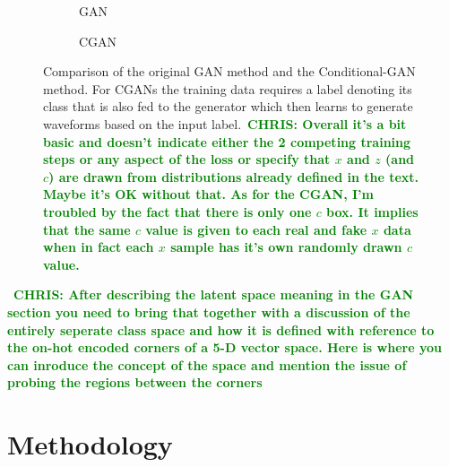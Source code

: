\documentclass[12pt]{iopart}
\newcommand{\chris}[1]{\textbf{\textcolor{green}{CHRIS: #1}}}
\begin{document}
\begin{figure}[h!]
    \begin{subfigure}{.5\textwidth}
     \centering
        
        \caption{GAN}
    \end{subfigure}
    \begin{subfigure}{.5\textwidth}
     \centering
        
        \caption{CGAN}
    \end{subfigure}
    \caption{Comparison of the original GAN method and the
Conditional-GAN method. For CGANs the training data requires a label denoting
its class that is also fed to the generator which then learns to generate
waveforms based on the input label.~\chris{Overall it's a bit basic and doesn't indicate either the
2 competing training steps or any aspect of the loss or specify that $x$ and
$z$ (and $c$) are drawn from distributions already defined in the text. Maybe it's OK without
that. As for the CGAN, I'm troubled by the fact that there is only one $c$ box.
It implies that the same $c$ value is given to each real and fake $x$ data when
in fact each $x$ sample has it's own randomly drawn $c$ value.}} \label{fig:gan_comparison}
\end{figure}



~\chris{After describing the latent space meaning in the GAN section you need
to bring that together with a discussion of the entirely seperate class space
and how it is defined with reference to the on-hot encoded corners of a 5-D
vector space. Here is where you can inroduce the concept of the space and
mention the issue of probing the regions between the corners}

\section{Methodology}

\end{document}
